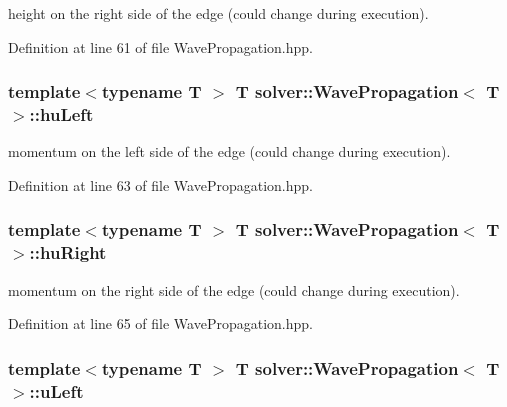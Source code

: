 height on the right side of the edge (could change during execution). 



Definition at line 61 of file Wave\+Propagation.\+hpp.

\subsubsection[{\texorpdfstring{hu\+Left}{huLeft}}]{\setlength{\rightskip}{0pt plus 5cm}template$<$typename T $>$ T {\bf solver\+::\+Wave\+Propagation}$<$ T $>$\+::hu\+Left\hspace{0.3cm}{\ttfamily [protected]}}\hypertarget{classsolver_1_1WavePropagation_a60c0a3d59b4e6225865f0442afbaa75d}{}\label{classsolver_1_1WavePropagation_a60c0a3d59b4e6225865f0442afbaa75d}


momentum on the left side of the edge (could change during execution). 



Definition at line 63 of file Wave\+Propagation.\+hpp.

\subsubsection[{\texorpdfstring{hu\+Right}{huRight}}]{\setlength{\rightskip}{0pt plus 5cm}template$<$typename T $>$ T {\bf solver\+::\+Wave\+Propagation}$<$ T $>$\+::hu\+Right\hspace{0.3cm}{\ttfamily [protected]}}\hypertarget{classsolver_1_1WavePropagation_a511d65348b55c407e9ca909acadad555}{}\label{classsolver_1_1WavePropagation_a511d65348b55c407e9ca909acadad555}


momentum on the right side of the edge (could change during execution). 



Definition at line 65 of file Wave\+Propagation.\+hpp.

\subsubsection[{\texorpdfstring{u\+Left}{uLeft}}]{\setlength{\rightskip}{0pt plus 5cm}template$<$typename T $>$ T {\bf solver\+::\+Wave\+Propagation}$<$ T $>$\+::u\+Left\hspace{0.3cm}{\ttfamily [protected]}}\hypertarget{classsolver_1_1WavePropagation_a987c0fc517379375f8120207a8af47d2}{}\label{classsolver_1_1WavePropagation_a987c0fc517379375f8120207a8af47d2}


